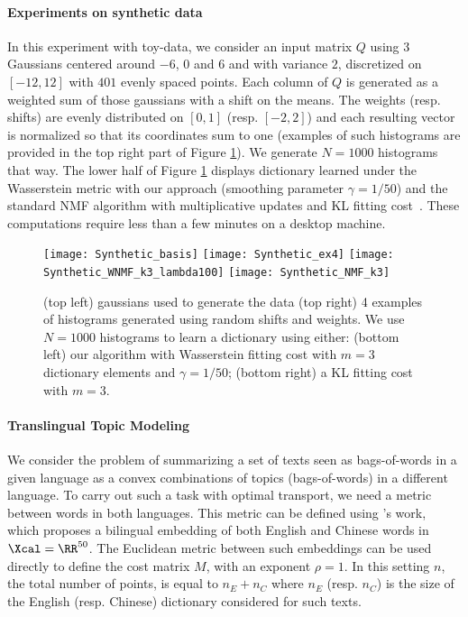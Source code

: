 \paragraph{Experiments on synthetic data}
In this experiment with toy-data, we consider an input matrix $Q$ using 3 Gaussians centered around $-6$, $0$ and $6$ and with variance $2$, discretized on $[-12, 12]$ with $401$ evenly spaced points. Each column of $Q$ is generated as a weighted sum of those gaussians with a shift on the means. The weights (resp. shifts) are evenly distributed on $[0, 1]$ (resp. $[-2, 2]$) and each resulting vector is normalized so that its coordinates sum to one (examples of such histograms are provided in the top right part of Figure \ref{fig:k3}). We generate $N=1000$ histograms that way. The lower half of Figure \ref{fig:k3} displays dictionary learned under the Wasserstein metric with our approach (smoothing parameter $\gamma=1/50$) and the standard NMF algorithm with multiplicative updates and KL fitting cost~\cite{lee1999learning}. These computations require less than a few minutes on a desktop machine.

\begin{figure}[!h]
        \centering
        \texttt{[image: Synthetic\_basis]}
        \texttt{[image: Synthetic\_ex4]}
        \texttt{[image: Synthetic\_WNMF\_k3\_lambda100]}
        \texttt{[image: Synthetic\_NMF\_k3]}
        \caption{(top left) gaussians used to generate the data (top right) 4 examples of histograms generated using random shifts and weights. We use $N=1000$ histograms to learn a dictionary using either: (bottom left) our algorithm with Wasserstein fitting cost with $m=3$ dictionary elements and $\gamma=1/50$; (bottom right) a KL fitting cost with $m=3$.}
        \label{fig:k3}
\end{figure}


\paragraph{Translingual Topic Modeling}
We consider the problem of summarizing a set of texts seen as bags-of-words in a given language as a convex combinations of topics (bags-of-words) in a different language. To carry out such a task with optimal transport, we need a metric between words in both languages. This metric can be defined using \cite{zou2013}'s work, which proposes a bilingual embedding of both English and Chinese words in $\Xcal=\RR^{50}$. The Euclidean metric between such embeddings can be used directly to define the cost matrix $M$, with an exponent $\rho=1$. In this setting $n$, the total number of points, is equal to $n_E+n_C$ where $n_E$ (resp. $n_C$) is the size of the English (resp. Chinese) dictionary considered for such texts.

